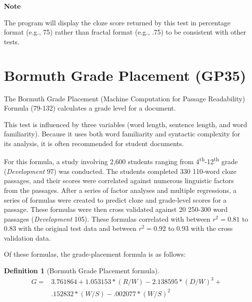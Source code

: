 \documentclass[
]{book}
\newenvironment{notesection}
    {
    \begin{tcolorbox}[colframe=mediumblue,colback=lightblue,coltext=mediumblue,arc=3mm]
    \faLightbulb[regular] \textbf{Note} \newline
    }
    {
    \end{tcolorbox}
    }
\theoremstyle{definition}
\newtheorem{definition}{Definition}[chapter]
\theoremstyle{definition}
\theoremstyle{definition}
\theoremstyle{definition}
\theoremstyle{remark}
\begin{document}
\begin{notesection}
The program will display the cloze score returned by this test in percentage format (e.g., 75) rather than fractal format (e.g., .75) to be consistent with other tests.

\end{notesection}


\newpage

\hypertarget{bormuth-grade-placement-35-machine-passage}{%
\section{\texorpdfstring{Bormuth Grade Placement (GP35)}{Bormuth Grade Placement (GP35)}}\label{bormuth-grade-placement-35-machine-passage}}

The Bormuth Grade Placement (Machine Computation for Passage Readability) Formula (79-132) calculates a grade level for a document.

This test is influenced by three variables (word length, sentence length, and word familiarity). Because it uses both word familiarity and syntactic complexity for its analysis, it is often recommended for student documents.

For this formula, a study involving 2,600 students ranging from 4\textsuperscript{th}-12\textsuperscript{th} grade (\emph{Development} 97) was conducted. The students completed 330 110-word cloze passages, and their scores were correlated against numerous linguistic factors from the passages. After a series of factor analyses and multiple regressions, a series of formulas were created to predict cloze and grade-level scores for a passage. These formulas were then cross validated against 20 250-300 word passages (\emph{Development} 105). These formulas correlated with between \(r^2 = 0.81\) to \(0.83\) with the original test data and between \(r^2 = 0.92\) to \(0.93\) with the cross validation data.

Of these formulas, the grade-placement formula is as follows:

\begin{definition}[Bormuth Grade Placement formula]
\protect\hypertarget{def:bormuthgp}{}{\label{def:bormuthgp} {} }\begin{align*}
  G = & 3.761864 + 1.053153*(R/W) - 2.138595*(D/W)^3 + \\
      & .152832*(W/S) - .002077*(W/S)^2
\end{align*}
\end{definition}
\end{document}
